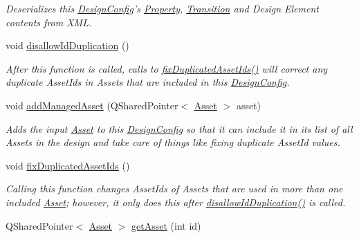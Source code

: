 \begin{DoxyCompactItemize}
\begin{DoxyCompactList}\small\item\em Deserializes this \hyperlink{class_picto_1_1_design_config}{Design\-Config}'s \hyperlink{class_picto_1_1_property}{Property}, \hyperlink{class_picto_1_1_transition}{Transition} and Design Element contents from X\-M\-L. \end{DoxyCompactList}\item 
void \hyperlink{class_picto_1_1_design_config_aa974bbd3d6288f50264f6a3c932743da}{disallow\-Id\-Duplication} ()
\begin{DoxyCompactList}\small\item\em After this function is called, calls to \hyperlink{class_picto_1_1_design_config_ab57e0738b97e4358ab09530cd6815fc0}{fix\-Duplicated\-Asset\-Ids()} will correct any duplicate Asset\-Ids in Assets that are included in this \hyperlink{class_picto_1_1_design_config}{Design\-Config}. \end{DoxyCompactList}\item 
\hypertarget{class_picto_1_1_design_config_a3583860f876fe8bbfff59942f2b1ad83}{void \hyperlink{class_picto_1_1_design_config_a3583860f876fe8bbfff59942f2b1ad83}{add\-Managed\-Asset} (Q\-Shared\-Pointer$<$ \hyperlink{class_picto_1_1_asset}{Asset} $>$ asset)}\label{class_picto_1_1_design_config_a3583860f876fe8bbfff59942f2b1ad83}

\begin{DoxyCompactList}\small\item\em Adds the input \hyperlink{class_picto_1_1_asset}{Asset} to this \hyperlink{class_picto_1_1_design_config}{Design\-Config} so that it can include it in its list of all Assets in the design and take care of things like fixing duplicate Asset\-Id values. \end{DoxyCompactList}\item 
void \hyperlink{class_picto_1_1_design_config_ab57e0738b97e4358ab09530cd6815fc0}{fix\-Duplicated\-Asset\-Ids} ()
\begin{DoxyCompactList}\small\item\em Calling this function changes Asset\-Ids of Assets that are used in more than one included \hyperlink{class_picto_1_1_asset}{Asset}; however, it only does this after \hyperlink{class_picto_1_1_design_config_aa974bbd3d6288f50264f6a3c932743da}{disallow\-Id\-Duplication()} is called. \end{DoxyCompactList}\item 
\hypertarget{class_picto_1_1_design_config_af336fdc849e93815000ac6648dccb93e}{Q\-Shared\-Pointer$<$ \hyperlink{class_picto_1_1_asset}{Asset} $>$ \hyperlink{class_picto_1_1_design_config_af336fdc849e93815000ac6648dccb93e}{get\-Asset} (int id)}\label{class_picto_1_1_design_config_af336fdc849e93815000ac6648dccb93e}


\end{DoxyCompactItemize}
